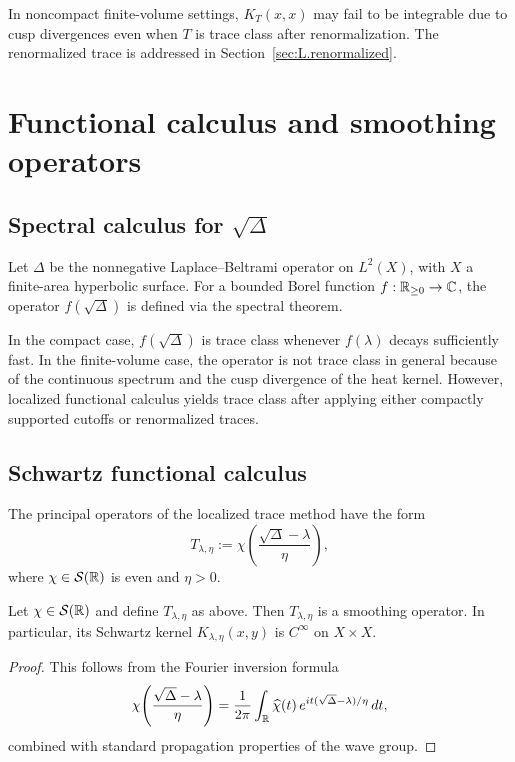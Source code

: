 \begin{remark}
\label{rem:L.noncompact.diagonal}
In noncompact finite-volume settings, $K_T(x,x)$ may fail to be integrable due to cusp divergences even when $T$ is
trace class after renormalization.  The renormalized trace is addressed in
Section~\ref{sec:L.renormalized}.
\end{remark}

\section{Functional calculus and smoothing operators}
\label{sec:L.functional}

\subsection{Spectral calculus for $\sqrt{\Delta}$}
\label{subsec:L.spectralcalc}

Let $\Delta$ be the nonnegative Laplace--Beltrami operator on $L^2(X)$, with $X$ a finite-area hyperbolic surface.
For a bounded Borel function $f:\mathbb{R}_{\ge 0}\to\mathbb{C}$, the operator $f(\sqrt{\Delta})$ is defined via the spectral theorem.

In the compact case, $f(\sqrt{\Delta})$ is trace class whenever $f(\lambda)$ decays sufficiently fast.
In the finite-volume case, the operator is not trace class in general because of the continuous spectrum and the cusp
divergence of the heat kernel.  However, localized functional calculus yields trace class after applying either
compactly supported cutoffs or renormalized traces.

\subsection{Schwartz functional calculus}
\label{subsec:L.schwartz}

The principal operators of the localized trace method have the form
\[
T_{\lambda,\eta} := \chi\!\left(\frac{\sqrt{\Delta}-\lambda}{\eta}\right),
\]
where $\chi\in\mathcal{S}(\mathbb{R})$ is even and $\eta>0$.

\begin{lemma}
\label{lem:L.kernel.smoothing}
Let $\chi\in\mathcal{S}(\mathbb{R})$ and define $T_{\lambda,\eta}$ as above. Then $T_{\lambda,\eta}$ is a smoothing operator.
In particular, its Schwartz kernel $K_{\lambda,\eta}(x,y)$ is $C^\infty$ on $X\times X$.
\end{lemma}

\begin{proof}
This follows from the Fourier inversion formula
\[
\chi\!\left(\frac{\sqrt{\Delta}-\lambda}{\eta}\right)
=
\frac{1}{2\pi}
\int_{\mathbb{R}}
\widehat{\chi}(t)\,
e^{it(\sqrt{\Delta}-\lambda)/\eta}\,dt,
\]
combined with standard propagation properties of the wave group.
\end{proof}

